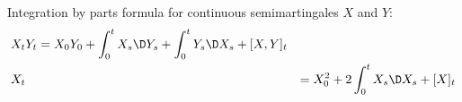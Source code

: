 

Integration by parts formula for continuous semimartingales $X$ and $Y$:
\begin{align}
  &X_t Y_t = X_0 Y_0 + \int^t_0 X_s \D Y_s + \int^t_0 Y_s \D X_s + [X,Y]_t\notag\\
  &X_t &= X_0^2 + 2 \int^t_0 X_s \D X_s  + [X]_t\notag
  \label{}
\end{align}

